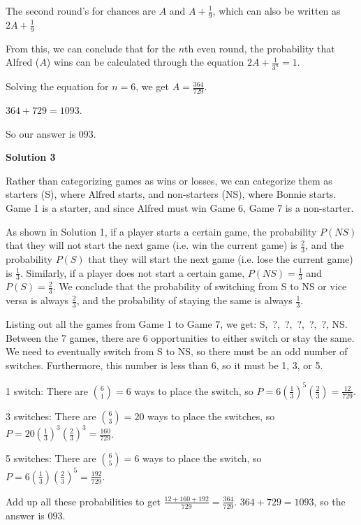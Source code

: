 \begin{enumerate}
 The second round’s for chances are $A$ and $A + \frac{1}{9}$, which can also be written as $2A + \frac{1}{9}$

 


 From this, we can conclude that for the $n$th even round, the probability that Alfred ($A$) wins can be calculated through the equation $2A + \frac{1}{3^n} = 1$.

 Solving the equation for $n = 6$, we get $A = \frac{364}{729}$.

 $364 + 729 = 1093$.

 So our answer is $\boxed{093}$.

 



\textbf{Solution 3}

Rather than categorizing games as wins or losses, we can categorize them as starters (S), where Alfred starts, and non-starters (NS), where Bonnie starts. Game 1 is a starter, and since Alfred must win Game 6, Game 7 is a non-starter.

 As shown in Solution 1, if a player starts a certain game, the probability $P(NS)$ that they will not start the next game (i.e. win the current game) is $\frac{2}{3}$, and the probability $P(S)$ that they will start the next game (i.e. lose the current game) is $\frac{1}{3}$. Similarly, if a player does not start a certain game, $P(NS) = \frac{1}{3}$ and $P(S) = \frac{2}{3}$. We conclude that the probability of switching from S to NS or vice versa is always $\frac{2}{3}$, and the probability of staying the same is always $\frac{1}{3}$.

 Listing out all the games from Game 1 to Game 7, we get: S, ?, ?, ?, ?, ?, NS. Between the 7 games, there are 6 opportunities to either switch or stay the same. We need to eventually switch from S to NS, so there must be an odd number of switches. Furthermore, this number is less than 6, so it must be 1, 3, or 5.

 1 switch: There are ${6 \choose 1} = 6$ ways to place the switch, so $P = 6\left(\frac{1}{3}\right)^5\left(\frac{2}{3}\right) = \frac{12}{729}$.

 3 switches: There are ${6 \choose 3} = 20$ ways to place the switches, so $P = 20\left(\frac{1}{3}\right)^3\left(\frac{2}{3}\right)^3 = \frac{160}{729}$.

 5 switches: There are ${6 \choose 5} = 6$ ways to place the switch, so $P = 6\left(\frac{1}{3}\right)\left(\frac{2}{3}\right)^5 = \frac{192}{729}$.

 Add up all these probabilities to get $\frac{12+160+192}{729} = \frac{364}{729}$.   $364+729=1093$, so the answer is $\boxed{093}$.


\end{enumerate}
